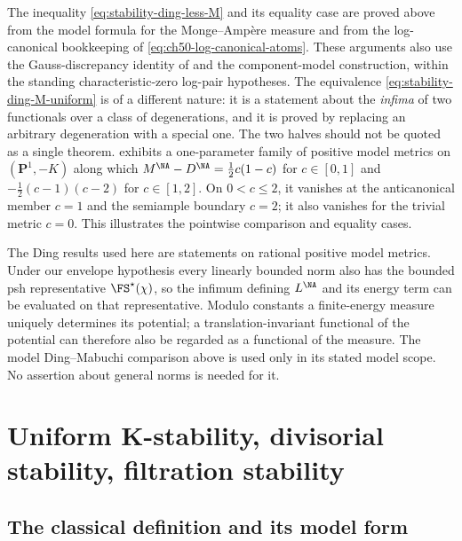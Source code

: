 \begin{remark}
\label{rem:ch50-ding-halves}
The inequality \eqref{eq:stability-ding-less-M} and its equality case are
proved above from the model formula for the Monge--Amp\`ere measure and
from the log-canonical bookkeeping of
\eqref{eq:ch50-log-canonical-atoms}.  These arguments also use the
Gauss-discrepancy identity of  and
the component-model construction, within the standing characteristic-zero
log-pair hypotheses.  The
equivalence \eqref{eq:stability-ding-M-uniform} is of a different nature:
it is a statement about the \emph{infima} of two functionals over a class
of degenerations, and it is proved by replacing an arbitrary degeneration
with a special one.  The two halves should not be quoted as a single
theorem.   exhibits a one-parameter family of
positive model metrics on $(\mathbf P^1,-K)$ along which
$M^{\NA}-D^{\NA}=\tfrac12 c(1-c)$ for $c\in[0,1]$ and
$-\tfrac12(c-1)(c-2)$ for $c\in[1,2]$.  On $0<c\le2$, it vanishes
at the anticanonical member $c=1$ and the semiample boundary $c=2$;
it also vanishes for the trivial metric $c=0$.  This illustrates the
pointwise comparison and equality cases.
\end{remark}

\begin{remark}
\label{rem:ch50-ding-scope}
The Ding results used here are statements on rational positive model
metrics.  Under our envelope hypothesis every linearly bounded norm
also has the bounded psh representative $\FS^\star(\chi)$, so the
infimum defining $L^{\NA}$ and its energy term can be evaluated on
that representative.  Modulo constants a finite-energy measure uniquely
determines its potential; a translation-invariant functional of the
potential can therefore also be regarded as a functional of the measure.
The model Ding--Mabuchi comparison above is used only in its stated
model scope.  No assertion about general norms is needed for it.
\end{remark}

\section{Uniform K-stability, divisorial stability, filtration stability}
\label{sec:ch50-uniform}

\subsection{The classical definition and its model form}
\label{sec:ch50-classical}

